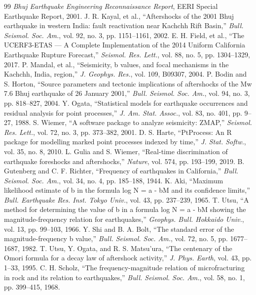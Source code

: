 \documentclass[journal]{IEEEtran}
\begin{document}
\begin{thebibliography}{99}
 \textit{Bhuj Earthquake Engineering Reconnaissance Report}, EERI Special Earthquake Report, 2001.
 J. R. Kayal, et al., ``Aftershocks of the 2001 Bhuj earthquake in western India: fault reactivation near Kachchh Rift Basin,'' \textit{Bull. Seismol. Soc. Am.}, vol. 92, no. 3, pp. 1151–1161, 2002.
 E. H. Field, et al., ``The UCERF3-ETAS — A Complete Implementation of the 2014 Uniform California Earthquake Rupture Forecast,'' \textit{Seismol. Res. Lett.}, vol. 88, no. 5, pp. 1304–1329, 2017.
 P. Mandal, et al., ``Seismicity, b values, and focal mechanisms in the Kachchh, India, region,'' \textit{J. Geophys. Res.}, vol. 109, B09307, 2004.
 P. Bodin and S. Horton, ``Source parameters and tectonic implications of aftershocks of the Mw 7.6 Bhuj earthquake of 26 January 2001,'' \textit{Bull. Seismol. Soc. Am.}, vol. 94, no. 3, pp. 818–827, 2004.
 Y. Ogata, ``Statistical models for earthquake occurrences and residual analysis for point processes,'' \textit{J. Am. Stat. Assoc.}, vol. 83, no. 401, pp. 9–27, 1988.
 S. Wiemer, ``A software package to analyze seismicity: ZMAP,'' \textit{Seismol. Res. Lett.}, vol. 72, no. 3, pp. 373–382, 2001.
 D. S. Harte, ``PtProcess: An R package for modelling marked point processes indexed by time,'' \textit{J. Stat. Softw.}, vol. 35, no. 8, 2010.
 L. Gulia and S. Wiemer, ``Real-time discrimination of earthquake foreshocks and aftershocks,'' \textit{Nature}, vol. 574, pp. 193–199, 2019.
 B. Gutenberg and C. F. Richter, ``Frequency of earthquakes in California,'' \textit{Bull. Seismol. Soc. Am.}, vol. 34, no. 4, pp. 185–188, 1944.
 K. Aki, ``Maximum likelihood estimate of b in the formula log N = a - bM and its confidence limits,'' \textit{Bull. Earthquake Res. Inst. Tokyo Univ.}, vol. 43, pp. 237–239, 1965.
 T. Utsu, ``A method for determining the value of b in a formula log N = a - bM showing the magnitude-frequency relation for earthquakes,'' \textit{Geophys. Bull. Hokkaido Univ.}, vol. 13, pp. 99–103, 1966.
 Y. Shi and B. A. Bolt, ``The standard error of the magnitude-frequency b value,'' \textit{Bull. Seismol. Soc. Am.}, vol. 72, no. 5, pp. 1677–1687, 1982.
 T. Utsu, Y. Ogata, and R. S. Matsu'ura, ``The centenary of the Omori formula for a decay law of aftershock activity,'' \textit{J. Phys. Earth}, vol. 43, pp. 1–33, 1995.
 C. H. Scholz, ``The frequency-magnitude relation of microfracturing in rock and its relation to earthquakes,'' \textit{Bull. Seismol. Soc. Am.}, vol. 58, no. 1, pp. 399–415, 1968.

\end{thebibliography}
\end{document}
